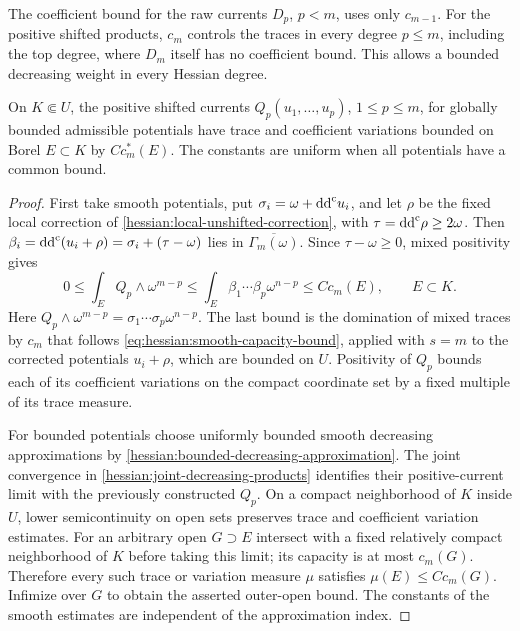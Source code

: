 The coefficient bound for the raw currents $D_p$, $p<m$, uses only
$c_{m-1}$. For the positive shifted products, $c_m$ controls the
traces in every degree $p\leq m$, including the top degree, where
$D_m$ itself has no coefficient bound. This allows a bounded
decreasing weight in every Hessian degree.

\begin{lemma}\label{hessian:positive-capacity-domination}
On $K\Subset U$, the positive shifted currents
$Q_p(u_1,\ldots,u_p)$, $1\leq p\leq m$, for globally bounded
admissible potentials have trace and coefficient variations bounded
on Borel $E\subset K$ by $C c_m^*(E)$. The constants are uniform
when all potentials have a common bound.
\end{lemma}
\begin{proof}
First take smooth potentials, put $\sigma_i=\omega+\mathrm{dd}^{\mathrm{c}} u_i$, and
let $\rho$ be the fixed local correction of
\cref{hessian:local-unshifted-correction}, with
$\tau=\mathrm{dd}^{\mathrm{c}}\rho\geq2\omega$. Then
$\beta_i=\mathrm{dd}^{\mathrm{c}}(u_i+\rho)=\sigma_i+(\tau-\omega)$ lies in
$\overline{\Gamma_m(\omega)}$. Since $\tau-\omega\geq0$, mixed
positivity gives
\[
 0\leq\int_E Q_p\wedge\omega^{m-p}
    \leq\int_E\beta_1\cdots\beta_p\omega^{n-p}
    \leq C c_m(E),\qquad E\subset K.
\]
Here $Q_p\wedge\omega^{m-p}=\sigma_1\cdots\sigma_p\omega^{n-p}$.
The last bound is the domination of mixed traces by $c_m$ that
follows \eqref{eq:hessian:smooth-capacity-bound}, applied with $s=m$
to the corrected potentials $u_i+\rho$, which are bounded on $U$.
Positivity of $Q_p$ bounds each of its
coefficient variations on the compact coordinate set by a fixed
multiple of its trace measure.

For bounded potentials choose uniformly bounded smooth decreasing
approximations by \cref{hessian:bounded-decreasing-approximation}. The joint
convergence in \cref{hessian:joint-decreasing-products} identifies
their positive-current limit with the previously constructed $Q_p$.
On a compact neighborhood of $K$ inside $U$, lower semicontinuity
on open sets preserves trace and coefficient variation estimates.
For an arbitrary open $G\supset E$ intersect with a fixed relatively
compact neighborhood of $K$ before taking this limit; its capacity
is at most $c_m(G)$. Therefore every such trace or variation measure
$\mu$ satisfies $\mu(E)\leq Cc_m(G)$. Infimize over $G$ to obtain
the asserted outer-open bound. The constants of the smooth estimates
are independent of the approximation index.
\end{proof}

